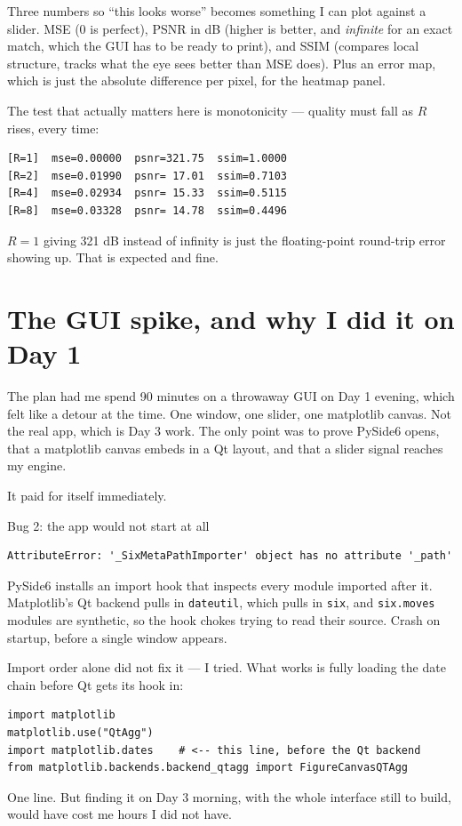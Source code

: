 \documentclass[11pt,a4paper]{article}
\begin{document}
Three numbers so ``this looks worse'' becomes something I can plot against a
slider. MSE (0 is perfect), PSNR in dB (higher is better, and \emph{infinite} for
an exact match, which the GUI has to be ready to print), and SSIM (compares local
structure, tracks what the eye sees better than MSE does). Plus an error map,
which is just the absolute difference per pixel, for the heatmap panel.

The test that actually matters here is monotonicity --- quality must fall as $R$
rises, every time:

\begin{lstlisting}
[R=1]  mse=0.00000  psnr=321.75  ssim=1.0000
[R=2]  mse=0.01990  psnr= 17.01  ssim=0.7103
[R=4]  mse=0.02934  psnr= 15.33  ssim=0.5115
[R=8]  mse=0.03328  psnr= 14.78  ssim=0.4496
\end{lstlisting}

$R=1$ giving 321 dB instead of infinity is just the floating-point round-trip
error showing up. That is expected and fine.

\section{The GUI spike, and why I did it on Day 1}

The plan had me spend 90 minutes on a throwaway GUI on Day 1 evening, which felt
like a detour at the time. One window, one slider, one matplotlib canvas. Not the
real app, which is Day 3 work. The only point was to prove PySide6 opens, that a
matplotlib canvas embeds in a Qt layout, and that a slider signal reaches my
engine.

It paid for itself immediately.

\begin{bugbox}{Bug 2: the app would not start at all}
\begin{lstlisting}
AttributeError: '_SixMetaPathImporter' object has no attribute '_path'
\end{lstlisting}
PySide6 installs an import hook that inspects every module imported after it.
Matplotlib's Qt backend pulls in \texttt{dateutil}, which pulls in \texttt{six},
and \texttt{six.moves} modules are synthetic, so the hook chokes trying to read
their source. Crash on startup, before a single window appears.

Import order alone did not fix it --- I tried. What works is fully loading the
date chain before Qt gets its hook in:
\begin{lstlisting}
import matplotlib
matplotlib.use("QtAgg")
import matplotlib.dates    # <-- this line, before the Qt backend
from matplotlib.backends.backend_qtagg import FigureCanvasQTAgg
\end{lstlisting}
One line. But finding it on Day 3 morning, with the whole interface still to
build, would have cost me hours I did not have.
\end{bugbox}
\end{document}
